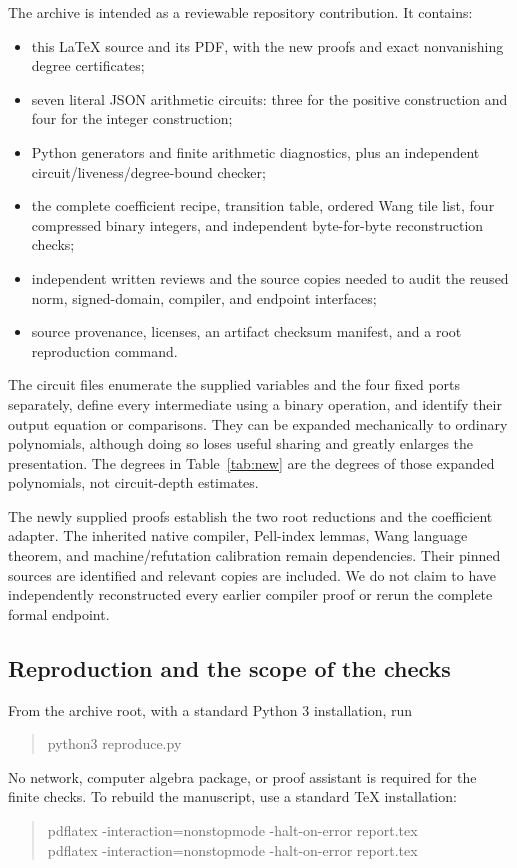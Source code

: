 The archive is intended as a reviewable repository contribution.
It contains:
\begin{itemize}
\item this \LaTeX{} source and its PDF, with the new proofs and
  exact nonvanishing degree certificates;
\item seven literal JSON arithmetic circuits: three for the
  positive construction and four for the integer construction;
\item Python generators and finite arithmetic diagnostics,
  plus an independent circuit/liveness/degree-bound checker;
\item the complete coefficient recipe, transition table, ordered
  Wang tile list, four compressed binary integers, and independent
  byte-for-byte reconstruction checks;
\item independent written reviews and the source copies needed
  to audit the reused norm, signed-domain, compiler, and endpoint
  interfaces;
\item source provenance, licenses, an artifact checksum manifest,
  and a root reproduction command.
\end{itemize}

The circuit files enumerate the supplied variables and the four
fixed ports separately, define every intermediate using a binary
operation, and identify their output equation or comparisons.
They can be expanded mechanically to ordinary polynomials,
although doing so loses useful sharing and greatly enlarges the
presentation. The degrees in Table~\ref{tab:new} are the degrees
of those expanded polynomials, not circuit-depth estimates.

The newly supplied proofs establish the two root reductions and
the coefficient adapter. The inherited native compiler,
Pell-index lemmas, Wang language theorem, and machine/refutation
calibration remain dependencies. Their pinned sources are
identified and relevant copies are included.
We do not claim to have independently reconstructed every
earlier compiler proof or rerun the complete formal endpoint.

\subsection{Reproduction and the scope of the checks}

From the archive root, with a standard Python 3 installation,
run
\begin{quote}\ttfamily
python3 reproduce.py
\end{quote}
No network, computer algebra package, or proof assistant is
required for the finite checks.
To rebuild the manuscript, use a standard \TeX{} installation:
\begin{quote}\ttfamily
pdflatex -interaction=nonstopmode -halt-on-error report.tex\\
pdflatex -interaction=nonstopmode -halt-on-error report.tex
\end{quote}

